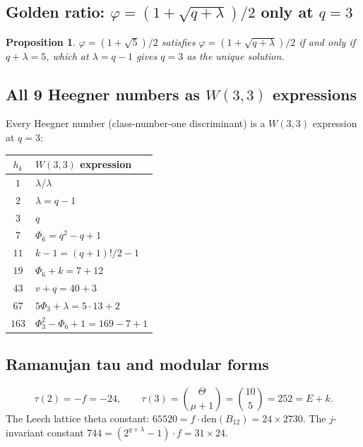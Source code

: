\documentclass[12pt,a4paper]{article}
\newtheorem{proposition}[theorem]{Proposition}
\theoremstyle{definition}
\newcommand{\Phithree}{\Phi_3}
\newcommand{\Phisix}{\Phi_6}
\newcommand{\den}{\mathrm{den}}
\begin{document}
\subsection{Golden ratio: \texorpdfstring{$\varphi=(1+\sqrt{q+\lambda})/2$}{phi} only at \texorpdfstring{$q=3$}{q=3}}

\begin{proposition}
\label{prop:golden}
$\varphi=(1+\sqrt{5})/2$ satisfies $\varphi=(1+\sqrt{q+\lambda})/2$
\emph{if and only if} $q+\lambda=5$, which at $\lambda=q-1$ gives
$q=3$ as the unique solution.
\end{proposition}

\subsection{All 9 Heegner numbers as \texorpdfstring{$W(3,3)$}{W(3,3)} expressions}

Every Heegner number (class-number-one discriminant) is a $W(3,3)$
expression at $q=3$:

\begin{center}
\renewcommand{\arraystretch}{1.25}
\begin{tabular}{cl}
\toprule
$h_k$ & $W(3,3)$ expression \\
\midrule
$1$   & $\lambda/\lambda$ \\
$2$   & $\lambda = q-1$ \\
$3$   & $q$ \\
$7$   & $\Phisix = q^2-q+1$ \\
$11$  & $k-1 = (q+1)!/2-1$ \\
$19$  & $\Phisix+k = 7+12$ \\
$43$  & $v+q = 40+3$ \\
$67$  & $5\Phithree+\lambda = 5\cdot 13+2$ \\
$163$ & $\Phithree^2-\Phisix+1 = 169-7+1$ \\
\bottomrule
\end{tabular}
\end{center}

\subsection{Ramanujan tau and modular forms}

\begin{equation}
  \tau(2) = -f = -24,\qquad
  \tau(3) = \binom{\Theta}{\mu+1} = \binom{10}{5} = 252 = E+k.
\end{equation}
The Leech lattice theta constant:
$65520 = f\cdot\den(B_{12}) = 24\times 2730$.
The $j$-invariant constant $744 = (2^{q+\lambda}-1)\cdot f = 31\times 24$.
\end{document}
